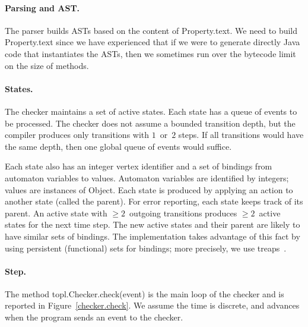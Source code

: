\documentclass{sigplanconf}[10pt] %
\begin{document}
\paragraph{Parsing and AST\null.}
The parser builds ASTs based on the content of \textsf{Property.text}.
We need to build \textsf{Property.text} since we have experienced that if we were to
 generate directly Java code that instantiates the ASTs,
 then we sometimes run over the bytecode limit on the size of methods.

\paragraph{States.}
The checker maintains a set of active states.
Each state has a queue of events to be processed.
The checker does not assume a bounded transition depth, but the compiler produces only transitions with $1$~or~$2$ steps.
If all transitions would have the same depth, then one global queue of events would suffice.

Each state also has an integer vertex identifier and a set of bindings from automaton variables to values.
Automaton variables are identified by integers; values are instances of \textsf{Object}.
Each state is produced by applying an action to another state (called the parent).
For error reporting, each state keeps track of its parent.
An active state with $\ge2$~outgoing transitions produces $\ge2$~active states for the next time step.
The new active states and their parent are likely to have similar sets of bindings.
The implementation takes advantage of this fact by using persistent (functional) sets for bindings; more precisely, we use treaps~\cite{treaps}.

\paragraph{Step.}
The method \textsf{topl.Checker.check(event)} is the main loop of the checker and is reported in Figure~\ref{checker.check}.
We assume the time is discrete, and advances when the program sends an event to the checker.
\end{document}
